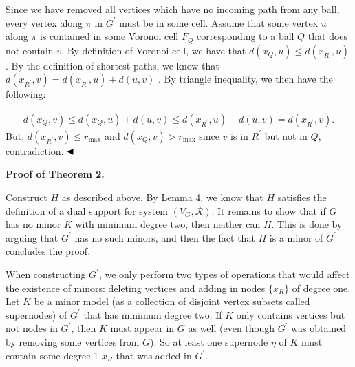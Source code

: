 \documentclass[10pt,a4paper]{article}
\begin{document}
\par
\par
Since we have removed all vertices which have no incoming path from any ball, every vertex along $\pi$ in $G^{\prime}$ must be in some cell. Assume that some vertex $u$ along $\pi$ is contained in some Voronoi cell $F_{Q}$ corresponding to a ball $Q$ that does not contain $v$. By definition of Voronoi cell, we have that $d(x_{Q},u)\leq d(x_{R^{\prime}},u)$. By the definition of shortest paths, we know that $d(x_{R^{\prime}},v)=d(x_{R^{\prime}},u)+d(u,v)$ . By triangle inequality, we then have the following:
\par
\[\begin{aligned}
d(x_{Q},v)\leq d(x_{Q},u)+d(u,v)\leq d(x_{R^{\prime}},u)+d(u,v)=d(x_{R^{\prime%
}},v).
\end{aligned}\]
But, $d(x_{R^{\prime}},v)\leq r_{\max}$ and $d(x_{Q},v)>r_{\max}$ since $v$ is in $R^{\prime}$ but not in $Q$, contradiction. $\hfill\blacktriangleleft$
\par
\par
\par\medskip\noindent\textbf{Proof of Theorem 2.}\par
Construct $H$ as described above. By Lemma 4, we know that $H$ satisfies the definition of a dual support for system $(V_{G},\mathcal{R})$. It remains to show that if $G$ has no minor $K$ with minimum degree two, then neither can $H$. This is done by arguing that $G^{\prime}$ has no such minors, and then the fact that $H$ is a minor of $G^{\prime}$ concludes the proof.
\par
\par
When constructing $G^{\prime}$, we only perform two types of operations that would affect the existence of minors: deleting vertices and adding in nodes $\{x_{R}\}$ of degree one. Let $K$ be a minor model (as a collection of disjoint vertex subsets called supernodes) of $G^{\prime}$ that has minimum degree two. If $K$ only contains vertices but not nodes in $G^{\prime}$, then $K$ must appear in $G$ as well (even though $G^{\prime}$ was obtained by removing some vertices from $G$). So at least one supernode $\eta$ of $K$ must contain some degree-1 $x_{R}$ that was added in $G^{\prime}$.
\par
\par
\end{document}

